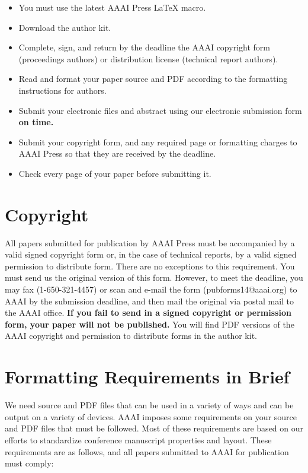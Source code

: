 \documentclass[letterpaper]{article}
\begin{document}
\begin{itemize}
\item You must use the latest AAAI Press \LaTeX{} macro.
\item Download the author kit.
\item Complete, sign, and return by the deadline the AAAI copyright form (proceedings authors) or distribution license (technical report authors).
\item Read and format your paper source and PDF according to the formatting instructions for authors.
\item Submit your electronic files and abstract using our electronic submission form \textbf{on time.}
\item Submit your copyright form, and any required page or formatting charges to AAAI Press so that they are received by the deadline.
\item Check every page of your paper before submitting it.
\end{itemize}

\section{Copyright}
All papers submitted for publication by AAAI Press must be accompanied by a valid signed copyright form or, in the case of technical reports, by a valid signed permission to distribute form. There are no exceptions to this requirement. You must send us the original version of this form. However, to meet the deadline, you may fax (1-650-321-4457) or scan and e-mail the form (pubforms14@aaai.org) to AAAI by the submission deadline, and then mail the original via postal mail to the AAAI office. \textbf{If you fail to send in a signed copyright or permission form, your paper will not be published.} You will find PDF versions of the AAAI copyright and permission to distribute forms in the author kit.

\section{Formatting Requirements in Brief}
We need source and PDF files that can be used in a variety of ways and can be output on a variety of devices. AAAI imposes some requirements on your source and PDF files that must be followed. Most of these requirements are based on our efforts to standardize conference manuscript properties and layout. These requirements are as follows, and all papers submitted to AAAI for publication must comply:
\end{document}
